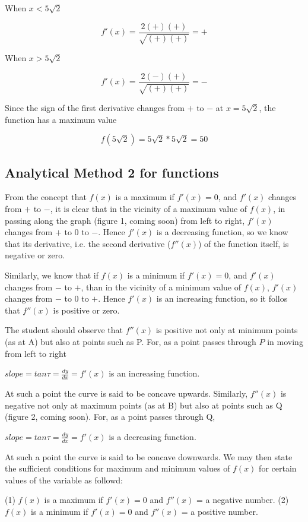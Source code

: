 \documentclass[12pt]{article}
\begin{document}
When $ x < 5\sqrt{2} $

$$ f'(x) = \frac{2(+)(+)}{\sqrt{(+)(+)}} = + $$

When $ x > 5\sqrt{2} $

$$ f'(x) = \frac{2(-)(+)}{\sqrt{(+)(+)}} = - $$

Since the sign of the first derivative changes from $+$ to $-$ at $x=5\sqrt{2}$, the function has a maximum value 

$$ f(5\sqrt{2}) = 5\sqrt{2} * 5\sqrt{2} = 50 $$

\subsection{Analytical Method 2 for functions}

From the concept that $f(x)$ is a maximum if $f'(x) = 0$, and $f'(x)$ changes from $+$ to $-$, it is clear that in the vicinity of a maximum value of $f(x)$, in passing along the graph (figure 1, coming soon) from left to right, $f'(x)$ changes from $+$ to $0$ to $-$.  Hence $f'(x)$ is a decreasing function, so we know that its derivative, i.e. the second derivative ($f''(x)$) of the function itself, is negative or zero.

Similarly, we know that if $f(x)$ is a minimum if $f'(x) = 0$, and $f'(x)$ changes from $-$ to $+$, than in the vicinity of a minimum value of $f(x)$, $f'(x)$ changes from $-$ to $0$ to $+$.  Hence $f'(x)$ is an increasing function, so it follos that $f''(x)$ is positive or zero.

The student should observe that $f''(x)$ is positive not only at minimum points (as at A) but also at points such as P.  For, as a point passes through $P$ in moving from left to right

$ slope = tan \tau = \frac{dy}{dx} = f'(x)$ is an increasing function.

At such a point the curve is said to be concave upwards.  Similarly, $f''(x)$ is negative not only at maximum points (as at B) but also at points such as Q (figure 2, coming soon).  For, as a point passes through Q,

$ slope = tan \tau = \frac{dy}{dx} = f'(x)$ is a decreasing function.

At such a point the curve is said to be concave downwards.  We may then state the sufficient conditions for maximum and minimum values of $f(x)$ for certain values of the variable as followd:

(1) $f(x)$ is a maximum if $f'(x) = 0$ and $f''(x)$ = a negative number.
(2) $f(x)$ is a minimum if $f'(x) = 0$ and $f''(x)$ = a positive number.
\end{document}

